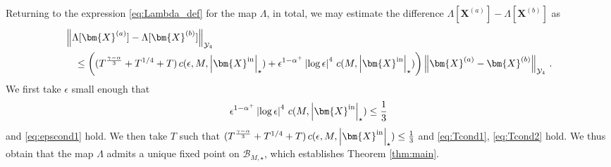 \documentclass[11pt,reqno]{amsart}
\newcommand{\T}{\mathbb{T}}
\newcommand{\X}{\bm{X}}
\newcommand{\abs}[1]{\left\lvert #1 \right\rvert}
\newcommand{\norm}[1]{\left\lVert #1 \right\rVert}
\newcommand{\mc}[1]{\mathcal{#1}}
\theoremstyle{definition}
\begin{document}
Returning to the expression \eqref{eq:Lambda_def} for the map $\Lambda$, in total, we may estimate the difference $\Lambda[\X^{(a)}]-\Lambda[\X^{(b)}]$ as
\begin{equation}
\begin{aligned}
  &\norm{\Lambda[\X^{(a)}]-\Lambda[\X^{(b)}]}_{\mc{Y}_4}\\
  &\quad\le \bigg((T^{\frac{\gamma-\alpha}{3}} + T^{1/4}+T)\,c(\epsilon,M,\abs{\X^{\rm in}}_\star) + \epsilon^{1-\alpha^+}\abs{\log\epsilon}^4\,c(M,\abs{\X^{\rm in}}_\star) \bigg)\norm{\X^{(a)}-\X^{(b)}}_{\mc{Y}_4}\,.
\end{aligned}
\end{equation}
%
%
We first take $\epsilon$ small enough that 
\begin{equation}\label{eq:epscond2}
\epsilon^{1-\alpha^+}\abs{\log\epsilon}^4\,c(M,\abs{\X^{\rm in}}_\star)\le \frac{1}{3}
\end{equation}
and \eqref{eq:epscond1} hold.
We then take $T$ such that $(T^{\frac{\gamma-\alpha}{3}} + T^{1/4}+T)\,c(\epsilon,M,\abs{\X^{\rm in}}_\star)\le \frac{1}{3}$ and \eqref{eq:Tcond1}, \eqref{eq:Tcond2} hold. We thus obtain that the map $\Lambda$ admits a unique fixed point on $\mc{B}_{M,\star}$, which establishes Theorem \ref{thm:main}.



\end{document}
